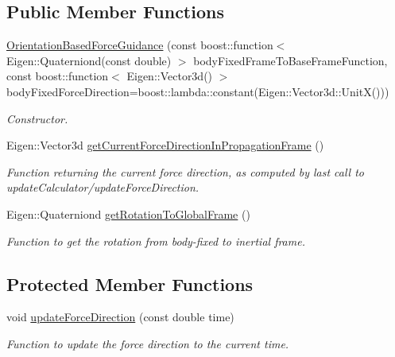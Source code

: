 \subsection*{Public Member Functions}
\begin{DoxyCompactItemize}
\item 
\hyperlink{classtudat_1_1propulsion_1_1OrientationBasedForceGuidance_a17906f5adb5ca617fd86d77ae0f6c149}{Orientation\+Based\+Force\+Guidance} (const boost\+::function$<$ Eigen\+::\+Quaterniond(const double) $>$ body\+Fixed\+Frame\+To\+Base\+Frame\+Function, const boost\+::function$<$ Eigen\+::\+Vector3d() $>$ body\+Fixed\+Force\+Direction=boost\+::lambda\+::constant(Eigen\+::\+Vector3d\+::\+UnitX()))
\begin{DoxyCompactList}\small\item\em Constructor. \end{DoxyCompactList}\item 
Eigen\+::\+Vector3d \hyperlink{classtudat_1_1propulsion_1_1OrientationBasedForceGuidance_a9072ced143f8661246542216f41c5858}{get\+Current\+Force\+Direction\+In\+Propagation\+Frame} ()
\begin{DoxyCompactList}\small\item\em Function returning the current force direction, as computed by last call to update\+Calculator/update\+Force\+Direction. \end{DoxyCompactList}\item 
Eigen\+::\+Quaterniond \hyperlink{classtudat_1_1propulsion_1_1OrientationBasedForceGuidance_ad447f8f7e37e219c8e8b6ec4ab3b0f50}{get\+Rotation\+To\+Global\+Frame} ()
\begin{DoxyCompactList}\small\item\em Function to get the rotation from body-\/fixed to inertial frame. \end{DoxyCompactList}\end{DoxyCompactItemize}
\subsection*{Protected Member Functions}
\begin{DoxyCompactItemize}
\item 
void \hyperlink{classtudat_1_1propulsion_1_1OrientationBasedForceGuidance_a4cd7dfac54b8948ecceb14a4565a1160}{update\+Force\+Direction} (const double time)
\begin{DoxyCompactList}\small\item\em Function to update the force direction to the current time. \end{DoxyCompactList}\end{DoxyCompactItemize}
